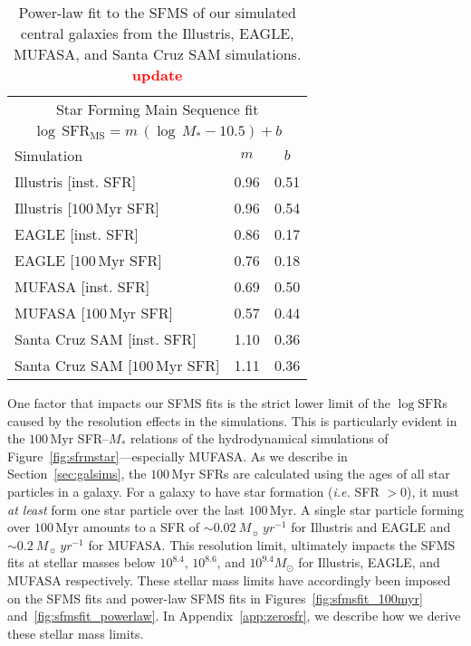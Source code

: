 \documentclass[preprint2,tighten]{aastex62}
\newcommand{\todo}[1]{{\bf \textcolor{red}{ #1}}}
\begin{document}
\begin{table}
\caption{Power-law fit to the SFMS of our simulated central galaxies from the
Illustris, EAGLE, MUFASA, and Santa Cruz SAM simulations.\todo{update}} 
\begin{center}
\begin{tabular}{p{5cm}cc} \toprule
\multicolumn{3}{c}{Star Forming Main Sequence fit} \\
\multicolumn{3}{c}{$\log\,\mathrm{SFR}_\mathrm{MS} = m\,(\log\,M_* - 10.5) + b$  } \\ [5pt]
Simulation & $m$ & $b$ \\ 
\hline
Illustris [inst. SFR] & 0.96 & 0.51 \\ 
Illustris [$100\,\mathrm{Myr}$ SFR] & 0.96 & 0.54 \\ [2pt]
EAGLE [inst. SFR] & 0.86 & 0.17 \\ 
EAGLE [$100\,\mathrm{Myr}$ SFR] & 0.76 & 0.18 \\ [2pt]
MUFASA [inst. SFR] & 0.69 & 0.50 \\ 
MUFASA [$100\,\mathrm{Myr}$ SFR] & 0.57 & 0.44 \\ [2pt]
Santa Cruz SAM [inst. SFR] & 1.10 & 0.36 \\ 
Santa Cruz SAM [$100\,\mathrm{Myr}$ SFR] & 1.11 & 0.36 \\ 
\hline
\end{tabular} \label{tab:sfms_powerlaw}
\end{center}
\end{table}

One factor that impacts our SFMS fits is the strict lower limit of the 
$\log\mathrm{SFR}$s caused by the resolution effects in the simulations. 
This is particularly evident in the $100\,\mathrm{Myr}$ SFR--$M_*$ 
relations of the hydrodynamical simulations of Figure~\ref{fig:sfrmstar}---especially 
MUFASA. As we describe in Section~\ref{sec:galsims}, the $100\,\mathrm{Myr}$ 
SFRs are  calculated using the ages of all star particles in a galaxy. For a galaxy to 
have star formation (\emph{i.e.} SFR $> 0$), it must \emph{at least} 
form one star particle over the last $100\,\mathrm{Myr}$. A single star particle 
forming over $100\,\mathrm{Myr}$ amounts to a SFR of 
$\sim 0.02\ M_{\sun}\ yr^{-1}$ for Illustris and EAGLE and
$\sim 0.2\ M_{\sun}\ yr^{-1}$ for MUFASA. This resolution limit, ultimately 
impacts the SFMS fits at stellar masses below $10^{8.4}$, $10^{8.6}$, and 
$10^{9.4}M_\odot$ for Illustris, EAGLE, and MUFASA respectively. 
These stellar mass limits have accordingly been imposed on the SFMS fits
and power-law SFMS fits in Figures~\ref{fig:sfmsfit_100myr} 
and~\ref{fig:sfmsfit_powerlaw}. In Appendix~\ref{app:zerosfr}, we describe
how we derive these stellar mass limits. 
\end{document}
